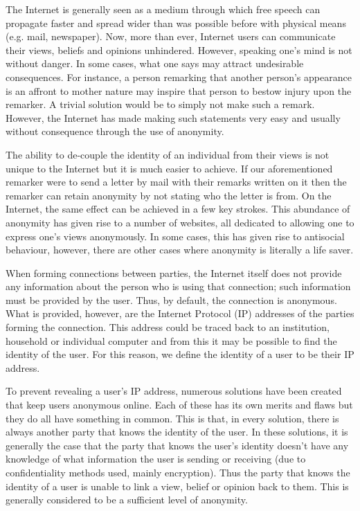 \documentclass[ %
                    author={Luke Murray},
                supervisor={Dr. Simon Hollis},
                     title={Shadow Peer-to-Peer Networks},
                  subtitle={},
                    degree={MEng},
                      year={2013} ]{thesis}
\begin{document}

The Internet is generally seen as a medium through which free speech can propagate faster and spread wider than was possible before with physical means (e.g. mail, newspaper). Now, more than ever, Internet users can communicate their views, beliefs and opinions unhindered. However, speaking one's mind is not without danger. In some cases, what one says may attract undesirable consequences. For instance, a person remarking that another person's appearance is an affront to mother nature may inspire that person to bestow injury upon the remarker. A trivial solution would be to simply not make such a remark. However, the Internet has made making such statements very easy and usually without consequence through the use of anonymity.

The ability to de-couple the identity of an individual from their views is not unique to the Internet but it is much easier to achieve. If our aforementioned remarker were to send a letter by mail with their remarks written on it then the remarker can retain anonymity by not stating who the letter is from. On the Internet, the same effect can be achieved in a few key strokes. This abundance of anonymity has given rise to a number of websites, all dedicated to allowing one to express one's views anonymously. In some cases, this has given rise to antisocial behaviour, however, there are other cases where anonymity is literally a life saver.

When forming connections between parties, the Internet itself does not provide any information about the person who is using that connection; such information must be provided by the user. Thus, by default, the connection is anonymous. What is provided, however, are the Internet Protocol (IP) addresses of the parties forming the connection. This address could be traced back to an institution, household or individual computer and from this it may be possible to find the identity of the user. For this reason, we define the identity of a user to be their IP address. 

To prevent revealing a user's IP address, numerous solutions have been created that keep users anonymous online. Each of these has its own merits and flaws but they do all have something in common. This is that, in every solution, there is always another party that knows the identity of the user. In these solutions, it is generally the case that the party that knows the user's identity doesn't have any knowledge of what information the user is sending or receiving (due to confidentiality methods used, mainly encryption). Thus the party that knows the identity of a user is unable to link a view, belief or opinion back to them. This is generally considered to be a sufficient level of anonymity.
\end{document}
